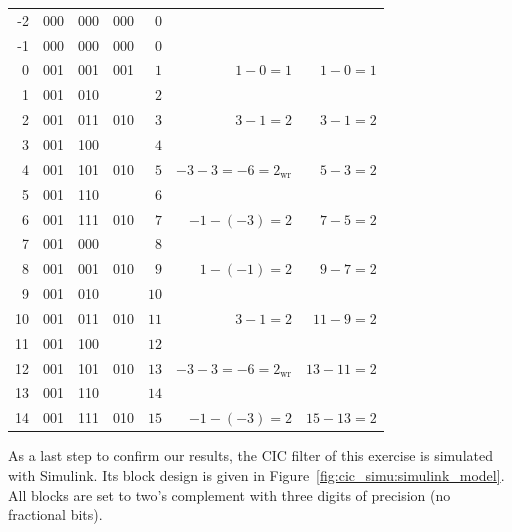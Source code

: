 \begin{table}
\begin{tabular}{rrrr|rrr}
        \midrule
        -2 & 000 &  000 & 000 & $ 0$ &                                    & \\
        -1 & 000 &  000 & 000 & $ 0$ &                                    & \\
         0 & 001 &  001 & 001 & $ 1$ & $  1 -   0  =  1                 $ & $ 1 - 0 = 1 $\\
         1 & 001 &  010 &     & $ 2$ &                                    & \\
         2 & 001 &  011 & 010 & $ 3$ & $  3 -   1  =  2                 $ & $ 3 - 1 = 2 $\\
         3 & 001 &  100 &     & $ 4$ &                                    & \\
         4 & 001 &  101 & 010 & $ 5$ & $ -3 -   3  = -6 = 2_\mathrm{wr} $ & $ 5 - 3 = 2 $\\
         5 & 001 &  110 &     & $ 6$ &                                    & \\
         6 & 001 &  111 & 010 & $ 7$ & $ -1 - (-3) =  2                 $ & $ 7 - 5 = 2 $\\
         7 & 001 &  000 &     & $ 8$ &                                    & \\
         8 & 001 &  001 & 010 & $ 9$ & $  1 - (-1) =  2                 $ & $ 9 - 7 = 2 $\\
         9 & 001 &  010 &     & $10$ &                                    & \\
        10 & 001 &  011 & 010 & $11$ & $  3 -   1  =  2                 $ & $ 11 - 9 = 2 $\\
        11 & 001 &  100 &     & $12$ &                                    & \\
        12 & 001 &  101 & 010 & $13$ & $ -3 -   3  = -6 = 2_\mathrm{wr} $ & $ 13 - 11 = 2 $\\
        13 & 001 &  110 &     & $14$ &                                    & \\
        14 & 001 &  111 & 010 & $15$ & $ -1 - (-3) =  2                 $ & $ 15 - 13 = 2 $\\
        \bottomrule
    \end{tabular}
\end{table}

As  a   last  step   to  confirm   our  results,  the   CIC  filter   of  this
exercise  is   simulated  with   Simulink. Its  block   design  is   given  in
Figure~\ref{fig:cic_simu:simulink_model}. All   blocks   are  set   to   two's
complement with three digits of precision (no fractional bits).

